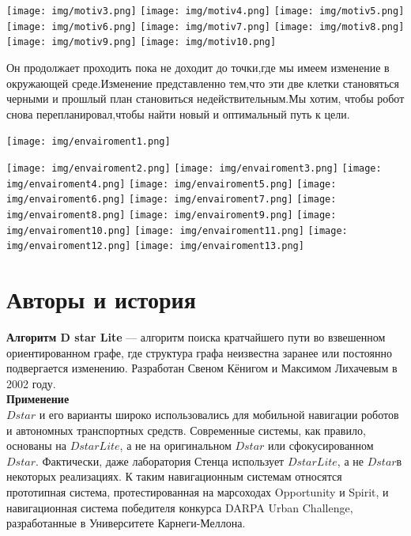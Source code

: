 \documentclass[12pt]{article}
\begin{document}
\begin{center}
        \texttt{[image: img/motiv3.png]}
        \texttt{[image: img/motiv4.png]}
        \texttt{[image: img/motiv5.png]}
        \texttt{[image: img/motiv6.png]}
        \texttt{[image: img/motiv7.png]}
        \texttt{[image: img/motiv8.png]}
        \texttt{[image: img/motiv9.png]}
        \texttt{[image: img/motiv10.png]}
\end{center}
Он продолжает проходить пока не доходит до точки,где мы имеем изменение в окружающей среде.Изменение представленно тем,что эти две клетки становяться черными и прошлый план становиться недействительным.Мы хотим, чтобы робот снова перепланировал,чтобы найти новый и оптимальный путь к цели.
\begin{center}
        \texttt{[image: img/envairoment1.png]}
        
\end{center}
\begin{center}
        \texttt{[image: img/envairoment2.png]}
        \texttt{[image: img/envairoment3.png]}
        \texttt{[image: img/envairoment4.png]}
        \texttt{[image: img/envairoment5.png]}
        \texttt{[image: img/envairoment6.png]}
        \texttt{[image: img/envairoment7.png]}
        \texttt{[image: img/envairoment8.png]}
        \texttt{[image: img/envairoment9.png]}
        \texttt{[image: img/envairoment10.png]}
        \texttt{[image: img/envairoment11.png]}
        \texttt{[image: img/envairoment12.png]}
        \texttt{[image: img/envairoment13.png]}     
\end{center}
\begin{center}
   \hypertarget{a2}{\section*{Авторы и история}}
\end{center}
\textbf{Алгоритм D star Lite} — алгоритм поиска кратчайшего пути во взвешенном ориентированном графе, где структура графа неизвестна заранее или постоянно подвергается изменению. Разработан Свеном Кёнигом и Максимом Лихачевым в 2002 году.\\
\textbf{Применение}\\
$D star$ и его варианты широко использовались для мобильной навигации роботов и автономных транспортных средств. Современные системы, как правило, основаны на $D star Lite$, а не на оригинальном $D star$ или сфокусированном $D star$. Фактически, даже лаборатория Стенца использует $D star Lite$, а не $D star$в некоторых реализациях. К таким навигационным системам относятся прототипная система, протестированная на марсоходах Opportunity и Spirit, и навигационная система победителя конкурса DARPA Urban Challenge, разработанные в Университете Карнеги-Меллона.
\end{document}

